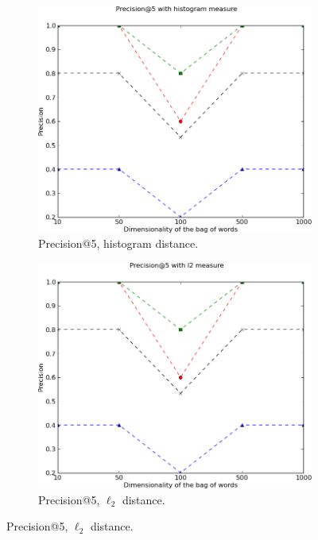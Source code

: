 \documentclass[a4paper,10pt,twoside]{article}
\begin{document}
\begin{figure}
  \begin{subfigure}{0.47\textwidth}
    \centering
    \includegraphics[width=\textwidth]{p5h}
    \caption{Precision@5, histogram distance.}
  \end{subfigure}
  \hspace*{\fill}
  \begin{subfigure}{0.47\textwidth}
    \centering
    \includegraphics[width=\textwidth]{p5l}
    \caption{Precision@5, $\ell_2$ distance.}
  \end{subfigure}

\end{figure}
\end{document}
